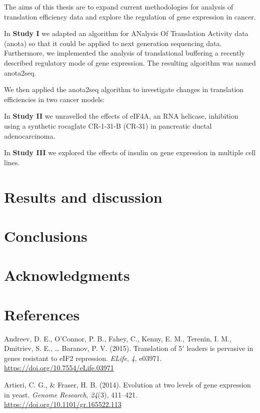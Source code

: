 \documentclass[12pt,openany]{book}
\begin{document}
The aims of this thesis are to expand current methodologies for analysis
of translation efficiency data and explore the regulation of gene
expression in cancer.

In \textbf{Study I} we adapted an algorithm for ANalysis Of Translation
Activity data (anota) so that it could be applied to next generation
sequencing data. Furthermore, we implemented the analysis of
translational buffering a recently described regulatory mode of gene
expression. The resulting algorithm was named anota2seq.

We then applied the anota2seq algorithm to investigate changes in
translation efficiencies in two cancer models:

In \textbf{Study II} we unravelled the effects of eIF4A, an RNA
helicase, inhibition using a synthetic rocaglate CR-1-31-B (CR-31) in
pancreatic ductal adenocarcinoma.

In \textbf{Study III} we explored the effects of insulin on gene
expression in multiple cell lines.

\chapter{Results and discussion}

\chapter{Conclusions}

\chapter*{Acknowledgments}\label{acknowledgments}

\chapter*{References}\label{references}

\hypertarget{refs}{}
\hypertarget{ref-Andreev2015}{}
Andreev, D. E., O'Connor, P. B., Fahey, C., Kenny, E. M., Terenin, I.
M., Dmitriev, S. E., \ldots{} Baranov, P. V. (2015). Translation of
5\({'}\) leaders is pervasive in genes resistant to eIF2 repression.
\emph{ELife}, \emph{4}, e03971.
\url{https://doi.org/10.7554/eLife.03971}

\hypertarget{ref-Artieri2014}{}
Artieri, C. G., \& Fraser, H. B. (2014). Evolution at two levels of gene
expression in yeast. \emph{Genome Research}, \emph{24}(3), 411--421.
\url{https://doi.org/10.1101/gr.165522.113}
\end{document}
